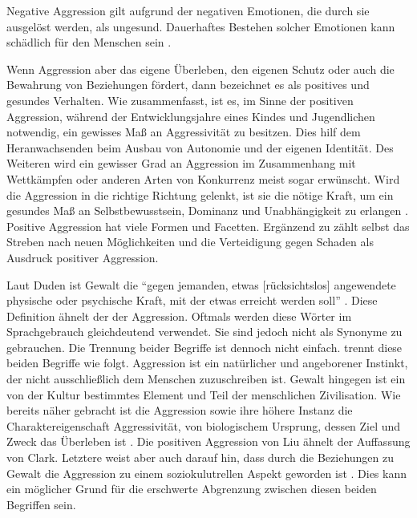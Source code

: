 Negative Aggression gilt aufgrund der negativen Emotionen, die durch sie ausgelöst werden, als ungesund. Dauerhaftes Bestehen solcher Emotionen kann  schädlich für den Menschen sein \parencite{Aggression}.

Wenn Aggression aber das eigene Überleben, den eigenen Schutz oder auch die Bewahrung von Beziehungen fördert, dann bezeichnet \textcite{positive_aggression} 
es als positives und gesundes Verhalten. Wie \textcite{Aggression} zusammenfasst, ist es, im Sinne der positiven Aggression, während der Entwicklungsjahre eines 
Kindes und Jugendlichen notwendig, ein gewisses Maß an Aggressivität zu besitzen. Dies hilf dem Heranwachsenden beim Ausbau von Autonomie und der eigenen Identität. Des Weiteren wird ein gewisser Grad an Aggression im Zusammenhang mit Wettkämpfen oder anderen Arten von Konkurrenz meist sogar erwünscht. Wird die Aggression in die richtige Richtung gelenkt, ist sie die nötige Kraft, um ein gesundes Maß an Selbstbewusstsein, Dominanz und Unabhängigkeit zu erlangen \parencite{Aggression}. Positive Aggression hat viele Formen und Facetten. Ergänzend zu \textcite{positive_aggression} zählt \textcite{jack1999behind} selbst das Streben nach neuen Möglichkeiten und die Verteidigung gegen Schaden als Ausdruck positiver Aggression.

Laut Duden ist Gewalt die \enquote{gegen jemanden, etwas [rücksichtslos] angewendete physische oder psychische Kraft, mit der etwas erreicht werden soll} \parencite{Gewalt_Duden}. Diese Definition ähnelt der der Aggression. Oftmals werden diese Wörter im Sprachgebrauch gleichdeutend verwendet. Sie sind jedoch nicht als Synonyme zu gebrauchen. Die Trennung beider Begriffe ist dennoch nicht einfach. \textcite{Def_Aggressivität_vs_violence} trennt diese beiden Begriffe wie folgt. Aggression ist ein natürlicher und angeborener Instinkt, der nicht ausschließlich dem Menschen zuzuschreiben ist. Gewalt hingegen ist ein von der Kultur bestimmtes Element und Teil der menschlichen Zivilisation. Wie bereits näher gebracht ist die Aggression sowie ihre höhere Instanz die Charaktereigenschaft Aggressivität, von biologischem Ursprung, dessen Ziel und Zweck das Überleben ist \parencite{Def_Aggressivität_vs_violence, Aggression}.
Die positiven Aggression von Liu ähnelt der Auffassung von Clark. Letztere weist aber auch darauf hin, dass durch die Beziehungen zu Gewalt die Aggression zu einem soziokulutrellen Aspekt geworden ist \parencite{Def_Aggressivität_vs_violence}.
Dies kann ein möglicher Grund für die erschwerte Abgrenzung zwischen diesen beiden
Begriffen sein. 

